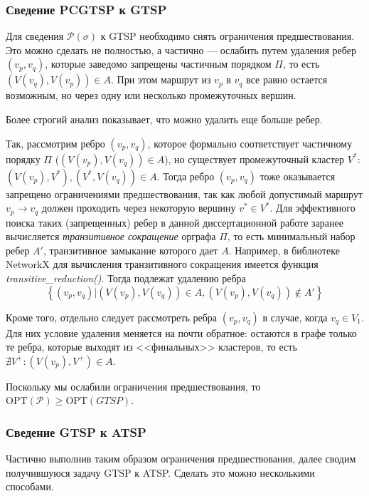 \subsubsection{Сведение PCGTSP к GTSP}

Для сведения
$\mathcal P(\sigma)$
к GTSP
необходимо снять ограничения предшествования.
Это можно сделать не полностью, а частично ---
ослабить
путем удаления ребер
$(v_p, v_q)$, которые заведомо запрещены
частичным порядком $\Pi$,
то есть
$(V(v_q), V(v_p))\in A$.
При этом маршрут из $v_p$ в $v_q$
все равно остается возможным,
но через одну или несколько промежуточных вершин.

Более строгий анализ показывает,
что можно удалить еще больше ребер.

Так, рассмотрим ребро
$(v_p, v_q)$,
которое формально соответствует частичному порядку $\Pi$
($(V(v_p), V(v_q))\in A$),
но существует промежуточный кластер $V^*$:
$(V(v_p), V^*), (V^*, V(v_q))\in A$.
Тогда ребро
$(v_p, v_q)$
тоже оказывается запрещено ограничениями предшествования,
так как любой допустимый маршрут
$v_p \to v_q$
должен проходить через некоторую вершину
$v^* \in V^*$.
Для эффективного поиска таких
(запрещенных)
ребер
в данной диссертационной работе
заранее вычисляется
\textit{транзитивное сокращение}
орграфа $\Pi$,
то есть минимальный набор ребер
$A'$,
транзитивное замыкание которого дает $A$.
Например, в библиотеке NetworkX \cite{bi:NetworkX}
для вычисления транзитивного сокращения
имеется функция \textit{transitive\_reduction()}.
Тогда подлежат удалению ребра
$$
\left\{(v_p, v_q)|
  (V(v_p), V(v_q))\in A, (V(v_p), V(v_q))\notin A'\right\}
$$

Кроме того, отдельно следует рассмотреть ребра
$(v_p, v_q)$
в случае, когда
$v_q\in V_1$.
Для них условие удаления меняется на почти обратное:
остаются в графе только те ребра,
которые выходят из <<финальных>> кластеров,
то есть
$\nexists V^+ \colon (V(v_p), V^+)\in A$.

Поскольку мы ослабили ограничения предшествования,
то
$\mathrm{OPT}(\mathcal P) \geqslant \mathrm{OPT}(GTSP)$.

\subsubsection{Сведение GTSP к ATSP}
Частично выполнив таким образом ограничения предшествования,
далее сводим получившуюся задачу GTSP
к ATSP. Сделать это можно несколькими способами.


